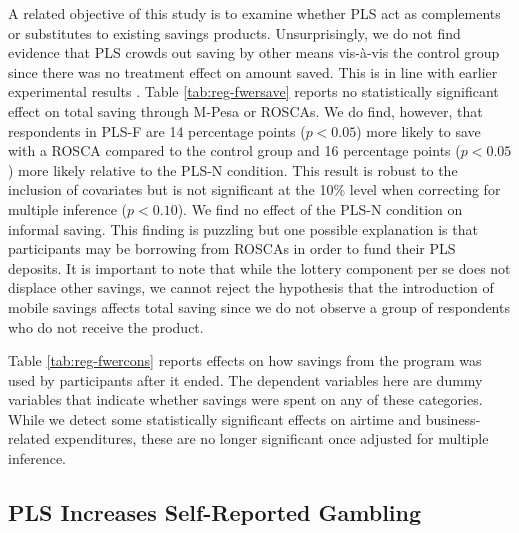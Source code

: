 \documentclass[12pt, titlepage]{article}
\begin{document}
		A related objective of this study is to examine whether PLS act as complements or substitutes to existing savings products. Unsurprisingly, we do not find evidence that PLS crowds out saving by other means vis-\`{a}-vis the control group since there was no treatment effect on amount saved. This is in line with earlier experimental results \parencite{atalay_savings_2014,filiz-ozbay_lottery_2015,dizon_leveraging_2016}. Table \ref{tab:reg-fwersave} reports no statistically significant effect on total saving through M-Pesa or ROSCAs. We do find, however, that respondents in PLS-F are 14 percentage points ($p < 0.05$) more likely to save with a ROSCA compared to the control group and 16 percentage points ($p < 0.05$) more likely relative to the PLS-N condition. This result is robust to the inclusion of covariates but is not significant at the 10\% level when correcting for multiple inference ($p < 0.10$). We find no effect of the PLS-N condition on informal saving. This finding is puzzling but one possible explanation is that participants may be borrowing from ROSCAs in order to fund their PLS deposits. It is important to note that while the lottery component per se does not displace other savings, we cannot reject the hypothesis that the introduction of mobile savings affects total saving since we do not observe a group of respondents who do not receive the product.

		

		Table \ref{tab:reg-fwercons} reports effects on how savings from the program was used by participants after it ended. The dependent variables here are dummy variables that indicate whether savings were spent on any of these categories. While we detect some statistically significant effects on airtime and business-related expenditures, these are no longer significant once adjusted for multiple inference.

		

	\subsection{PLS Increases Self-Reported Gambling}
\end{document}
